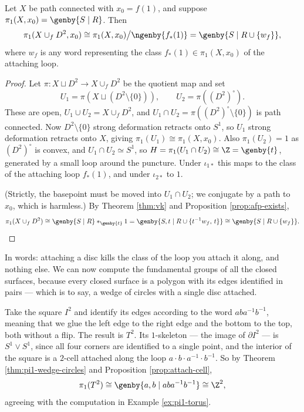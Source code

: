 \begin{proposition} \label{prop:attach-cell}
	Let $X$ be path connected with $x_0 = f(1)$, and suppose $\pi_1(X,x_0) = \genby{S \mid R}$. Then
	$$
	\pi_1(X\cup_f D^2, x_0) \cong \pi_1(X, x_0)\big/\ngenby{f_*(1)} = \genby{S \mid R \cup \{w_f\}},
	$$
	where $w_f$ is any word representing the class $f_*(1) \in \pi_1(X,x_0)$ of the attaching loop.
\end{proposition}
\begin{proof}
	Let $\pi: X \sqcup D^2 \to X\cup_f D^2$ be the quotient map and set
	$$
	U_1 = \pi(X \sqcup (D^2\setminus\{0\})), \qquad U_2 = \pi((D^2)^\circ).
	$$
	These are open, $U_1 \cup U_2 = X \cup_f D^2$, and $U_1 \cap U_2 = \pi((D^2)^\circ \setminus \{0\})$ is path connected. Now $D^2 \setminus\{0\}$ strong deformation retracts onto $S^1$, so $U_1$ strong deformation retracts onto $X$, giving $\pi_1(U_1) \cong \pi_1(X, x_0)$. Also $\pi_1(U_2) = 1$ as $(D^2)^\circ$ is convex, and $U_1 \cap U_2 \simeq S^1$, so $H = \pi_1(U_1\cap U_2) \cong \Z = \genby{t}$, generated by a small loop around the puncture. Under $\iota_{1*}$ this maps to the class of the attaching loop $f_*(1)$, and under $\iota_{2*}$ to $1$.

	(Strictly, the basepoint must be moved into $U_1 \cap U_2$; we conjugate by a path to $x_0$, which is harmless.) By Theorem \ref{thm:vk} and Proposition \ref{prop:afp-exists},
	$$
	\pi_1(X\cup_f D^2) \cong \genby{S \mid R} *_{\genby{t}} 1 = \genby{S, t \mid R \cup \{t^{-1}w_f, \, t\}} \cong \genby{S \mid R \cup \{w_f\}}. \qedhere
	$$
\end{proof}

In words: attaching a disc kills the class of the loop you attach it along, and nothing
else. We can now compute the fundamental groups of all the closed surfaces, because every
closed surface is a polygon with its edges identified in pairs --- which is to say, a
wedge of circles with a single disc attached.

\begin{example} \label{ex:torus-vk}
	Take the square $I^2$ and identify its edges according to the word $aba^{-1}b^{-1}$, meaning that we glue the left edge to the right edge and the bottom to the top, both without a flip. The result is $T^2$. Its $1$-skeleton --- the image of $\partial I^2$ --- is $S^1 \vee S^1$, since all four corners are identified to a single point, and the interior of the square is a $2$-cell attached along the loop $a\cdot b\cdot a^{-1}\cdot b^{-1}$. So by Theorem \ref{thm:pi1-wedge-circles} and Proposition \ref{prop:attach-cell},
	$$
	\pi_1(T^2) \cong \genby{a, b \mid aba^{-1}b^{-1}} \cong \Z^2,
	$$
	agreeing with the computation in Example \ref{ex:pi1-torus}.
\end{example}

